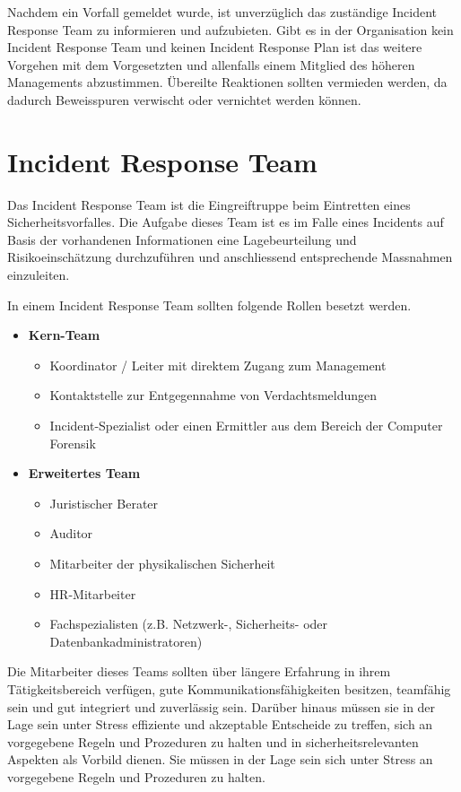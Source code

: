 
Nachdem ein Vorfall gemeldet wurde, ist unverzüglich das zuständige Incident Response Team zu informieren und aufzubieten. Gibt es in der Organisation kein Incident Response Team und keinen Incident Response Plan ist das weitere Vorgehen mit dem Vorgesetzten und allenfalls einem Mitglied des höheren Managements abzustimmen. Übereilte Reaktionen sollten vermieden werden, da dadurch Beweisspuren verwischt oder vernichtet werden können. 

\section{Incident Response Team}
Das Incident Response Team ist die Eingreiftruppe beim Eintretten eines Sicherheitsvorfalles. Die Aufgabe dieses Team ist es im Falle eines Incidents auf Basis der vorhandenen Informationen eine Lagebeurteilung und Risikoeinschätzung durchzuführen und anschliessend entsprechende Massnahmen einzuleiten.

In einem Incident Response Team sollten folgende Rollen besetzt werden.

\begin{itemize}
\item \textbf{Kern-Team} \\
\begin{itemize}
\item Koordinator / Leiter mit direktem Zugang zum Management
\item Kontaktstelle zur Entgegennahme von Verdachtsmeldungen
\item Incident-Spezialist oder einen Ermittler aus dem Bereich der Computer Forensik
\end{itemize}
\item \textbf{Erweitertes Team} \\
\begin{itemize}
\item Juristischer Berater
\item Auditor
\item Mitarbeiter der physikalischen Sicherheit
\item HR-Mitarbeiter
\item Fachspezialisten (z.B. Netzwerk-, Sicherheits- oder Datenbankadministratoren)
\end{itemize}
\end{itemize}

Die Mitarbeiter dieses Teams sollten über längere Erfahrung in ihrem Tätigkeitsbereich verfügen, gute Kommunikationsfähigkeiten besitzen, teamfähig sein und gut integriert und zuverlässig sein. Darüber hinaus müssen sie in der Lage sein unter Stress effiziente und akzeptable Entscheide zu treffen, sich an vorgegebene Regeln und Prozeduren zu halten und in sicherheitsrelevanten Aspekten als Vorbild dienen. Sie müssen in der Lage sein sich unter Stress an vorgegebene Regeln und Prozeduren zu halten.

